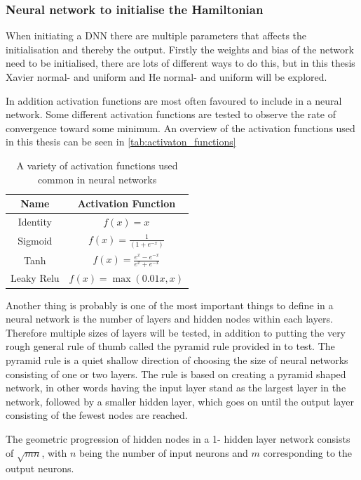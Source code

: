 \documentclass[../main.tex]{subfiles}
\begin{document}
\subsubsection{Neural network to initialise the Hamiltonian}
When initiating a DNN there are multiple parameters that affects the initialisation and thereby the output. Firstly the weights and bias of the network need to be initialised, there are lots of different ways to do this, but in this thesis Xavier normal- and uniform and He normal- and uniform will be explored.

In addition activation functions are most often favoured to include in a neural network. Some different activation functions are tested to observe the rate of convergence toward some minimum. An overview of the activation functions used in this thesis can be seen in \autoref{tab:activaton_functions}

\begin{table}[h!]
\centering
\caption{A variety of activation functions used common in neural networks}
\begin{tabular}{c c} 
\hline
Name  & Activation Function \\
\hline
Identity  & $f(x)=x$ \\
Sigmoid  & $f(x)=\frac{1}{(1+e^{-x})}$ \\
Tanh  & $f(x)=\frac{e^x-e^{-x}}{e^x+e^{-x}} $ \\
Leaky Relu  & $f(x)=\max(0.01x, x)$ \\
\end{tabular}
\label{tab:activaton_functions}
\end{table}

Another thing is probably is one of the most important things to define in a neural network is the number of layers and hidden nodes within each layers. Therefore multiple sizes of layers will be tested, in addition to putting the very rough general rule of thumb called the pyramid rule provided in \cite[ch.~10]{Timothy_Masters} to test. The pyramid rule is a quiet shallow direction of choosing the size of neural networks consisting of one or two layers. The rule is based on creating a pyramid shaped network, in other words having the input layer stand as the largest layer in the network, followed by a smaller hidden layer, which goes on until the output layer consisting of the fewest nodes are reached. 

The geometric progression of hidden nodes in a 1- hidden layer network consists of $\sqrt{mn}$, with $n$ being the number of input neurons and $m$ corresponding to the output neurons.
\end{document}
